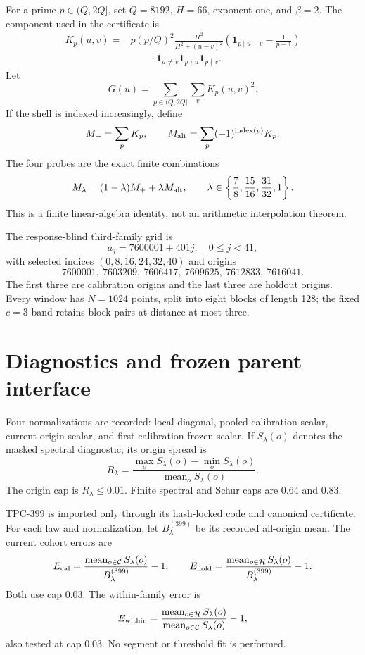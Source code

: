 \documentclass[10pt]{article}
\begin{document}
For a prime $p\in(Q,2Q]$, set $Q=8192$, $H=66$, exponent one, and $\beta=2$.
The component used in the certificate is
\begin{align*}
 K_p(u,v)={}&p(p/Q)^2\frac{H^2}{H^2+(u-v)^2}
 \left(\mathbf 1_{p\mid u-v}-\frac{1}{p-1}\right)\\
 &\qquad\cdot\mathbf 1_{u\ne v}\mathbf 1_{p\nmid u}\mathbf 1_{p\nmid v}.
\end{align*}
Let
\[
 G(u)=\sum_{p\in(Q,2Q]}\sum_v K_p(u,v)^2.
\]
If the shell is indexed increasingly, define
\[
 M_+=\sum_p K_p,\qquad
 M_{\rm alt}=\sum_p(-1)^{\operatorname{index}(p)}K_p.
\]
The four probes are the exact finite combinations
\[
 M_\lambda=(1-\lambda)M_+ + \lambda M_{\rm alt},\qquad
 \lambda\in\left\{\frac78,\frac{15}{16},\frac{31}{32},1\right\}.
\]
This is a finite linear-algebra identity, not an arithmetic interpolation
theorem.

The response-blind third-family grid is
\[
 a_j=7600001+401j,\quad 0\leq j<41,
\]
with selected indices $(0,8,16,24,32,40)$ and origins
\[
 7600001,\ 7603209,\ 7606417,\ 7609625,\ 7612833,\ 7616041.
\]
The first three are calibration origins and the last three are holdout
origins.  Every window has $N=1024$ points, split into eight blocks of length
128; the fixed $c=3$ band retains block pairs at distance at most three.

\section{Diagnostics and frozen parent interface}

Four normalizations are recorded: local diagonal, pooled calibration scalar,
current-origin scalar, and first-calibration frozen scalar.  If
$S_\lambda(o)$ denotes the masked spectral diagnostic, its origin spread is
\[
 R_\lambda=\frac{\max_o S_\lambda(o)-\min_o S_\lambda(o)}
 {\operatorname{mean}_o S_\lambda(o)}.
\]
The origin cap is $R_\lambda\leq0.01$.  Finite spectral and Schur caps are
0.64 and 0.83.

TPC-399 is imported only through its hash-locked code and canonical
certificate.  For each law and normalization, let $B^{(399)}_\lambda$ be its
recorded all-origin mean.  The current cohort errors are
\[
 E_{\rm cal}=\frac{\operatorname{mean}_{o\in\mathcal C}S_\lambda(o)}
 {B^{(399)}_\lambda}-1,\qquad
 E_{\rm hold}=\frac{\operatorname{mean}_{o\in\mathcal H}S_\lambda(o)}
 {B^{(399)}_\lambda}-1.
\]
Both use cap 0.03.  The within-family error is
\[
 E_{\rm within}=\frac{\operatorname{mean}_{o\in\mathcal H}S_\lambda(o)}
 {\operatorname{mean}_{o\in\mathcal C}S_\lambda(o)}-1,
\]
also tested at cap 0.03.  No segment or threshold fit is performed.
\end{document}
